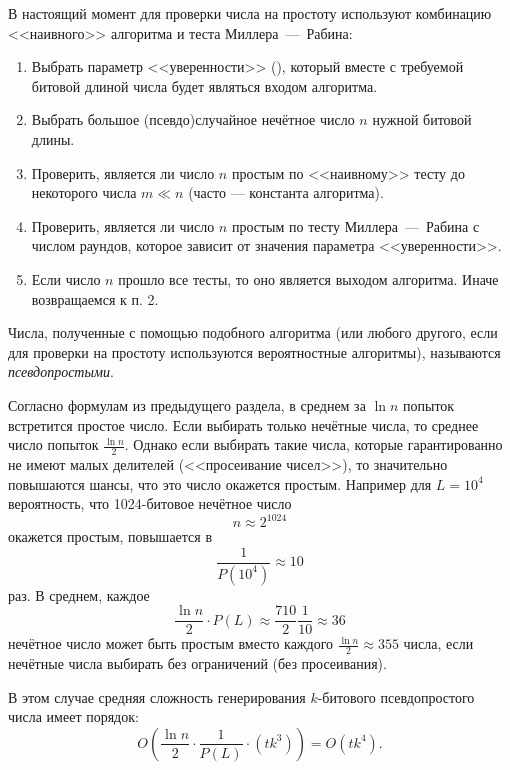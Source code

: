 В настоящий момент для проверки числа на простоту используют комбинацию <<наивного>> алгоритма и теста Миллера~---~Рабина:

\begin{enumerate}
	\item Выбрать параметр <<уверенности>> (), который вместе с требуемой битовой длиной числа будет являться входом алгоритма.
	\item Выбрать большое (псевдо)случайное нечётное число $n$ нужной битовой длины.
	\item Проверить, является ли число $n$ простым по <<наивному>> тесту до некоторого числа $m \ll n$ (часто --- константа алгоритма).
	\item Проверить, является ли число $n$ простым по тесту Миллера~---~Рабина с числом раундов, которое зависит от значения параметра <<уверенности>>.
	\item Если число $n$ прошло все тесты, то оно является выходом алгоритма. Иначе возвращаемся к п. 2.
\end{enumerate}

Числа, полученные с помощью подобного алгоритма (или любого другого, если для проверки на простоту используются вероятностные алгоритмы), называются \emph{псевдопростыми}.

Согласно формулам из предыдущего раздела, в среднем за $\ln n$ попыток встретится простое число. Если выбирать только нечётные числа, то среднее число попыток $\frac{\ln n}{2}$. Однако если выбирать такие числа, которые гарантированно не имеют малых делителей (<<просеивание чисел>>), то значительно повышаются шансы, что это число окажется простым. Например для $L = 10^4$ вероятность, что 1024-битовое нечётное число
    \[ n \approx 2^{1024} \]
окажется простым, повышается в
    \[ \frac{1}{P(10^4)} \approx 10 \]
раз. В среднем, каждое
    \[ \frac{\ln n}{2} \cdot P(L) \approx \frac{710}{2} \frac{1}{10} \approx 36 \]
нечётное число может быть простым вместо каждого $\frac{\ln n}{2} \approx 355$ числа, если нечётные числа выбирать без ограничений (без просеивания).

В этом случае средняя сложность генерирования $k$-битового псевдопростого числа имеет порядок:
    \[ O \left( \frac{\ln n}{2} \cdot \frac{1}{P(L)} \cdot \left( t k^3 \right) \right) = O(t k^4). \]
